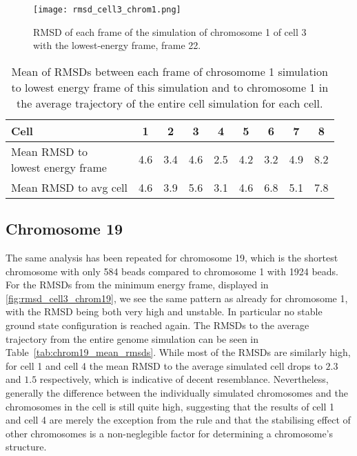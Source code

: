 \begin{figure}[ht]
\centering
	\texttt{[image: rmsd\_cell3\_chrom1.png]}
	\caption{RMSD of each frame of the simulation of chromosome 1 of cell 3 with the lowest-energy frame, frame 22.}
	\label{fig:rmsd_cell3_chrom1}
\end{figure}

\begin{table}[ht]
\centering
  \caption{Mean of RMSDs between each frame of chrosomome 1 simulation to lowest energy frame of this simulation and to chromosome 1 in the average trajectory of the entire cell simulation for each cell.}
  \label{tab:chrom1_mean_rmsds}
  \begin{tabular}{l @{\phantom{abc}} S S S S S S S S}
  \toprule
    Cell & 1 & 2 & 3 & 4 & 5 & 6 & 7 & 8 \\
  \midrule
    \parbox{4cm}{Mean RMSD to \\ lowest energy frame} & 4.6 & 3.4 & 4.6 & 2.5 & 4.2 & 3.2 & 4.9 & 8.2 \\
    Mean RMSD to avg cell & 4.6 & 3.9 & 5.6 & 3.1 & 4.6 & 6.8 & 5.1 & 7.8 \\
  \bottomrule
  \end{tabular}
\end{table}


\FloatBarrier

\subsection{Chromosome 19} %
\label{ssec:chromosome_19}

The same analysis has been repeated for chromosome 19, which is the shortest chromosome with only 584 beads compared to chromosome 1 with 1924 beads. For the RMSDs from the minimum energy frame, displayed in \ref{fig:rmsd_cell3_chrom19}, we see the same pattern as already for chromosome 1, with the RMSD being both very high and unstable. In particular no stable ground state configuration is reached again. The RMSDs to the average trajectory from the entire genome simulation can be seen in Table~\ref{tab:chrom19_mean_rmsds}. While most of the RMSDs are similarly high, for cell 1 and cell 4 the mean RMSD to the average simulated cell drops to \(2.3\) and \(1.5\) respectively, which is indicative of decent resemblance. Nevertheless, generally the difference between the individually simulated chromosomes and the chromosomes in the cell is still quite high, suggesting that the results of cell 1 and cell 4 are merely the exception from the rule and that the stabilising effect of other chromosomes is a non-neglegible factor for determining a chromosome's structure.

